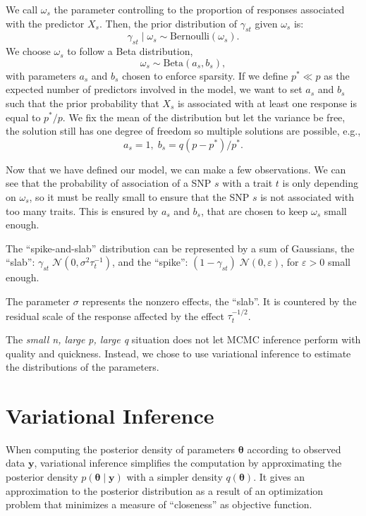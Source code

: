 \documentclass[a4paper, 11pt]{report}
\numberwithin{equation}{chapter}
\begin{document}
We call $\omega_s$ the parameter controlling to the proportion of responses associated with the predictor $X_s$. Then, the prior distribution of $\gamma_{st}$ given $\omega_s$ is:
\begin{equation*}
\gamma_{st} \mid \omega_s \sim  \text{Bernoulli}(\omega_s).
\end{equation*}
We choose $\omega_s$ to follow a Beta distribution,
\begin{equation*}
\omega_s \sim \text{Beta}(a_s, b_s),
\end{equation*}
with parameters $a_s$ and $b_s$ chosen to enforce sparsity. If we define $p^* \ll p$ as the expected number of predictors involved in the model, we want to set $a_s$ and $b_s$ such that the prior probability that $X_s$ is associated with at least one response is equal to $p^*/p$. We fix the mean of the distribution but let the variance be free, the solution still has one degree of freedom so multiple solutions are possible, e.g.,
\begin{equation*}
a_s = 1,\;b_s = q(p-p^*)/p^*.
\end{equation*}

Now that we have defined our model, we can make a few observations. We can see that the probability of association of a SNP $s$ with a trait $t$ is only depending on $\omega_s$, so it must be really small to ensure that the SNP $s$ is not associated with too many traits. This is ensured by $a_s$ and $b_s$, that are chosen to keep $\omega_s$ small enough.

The ``spike-and-slab'' distribution can be represented by a sum of Gaussians, the ``slab'': $\gamma_{st}\;\mathcal{N}\left(0,\sigma^2\tau_t^{-1}\right)$, and the ``spike'': $(1-\gamma_{st})\;\mathcal{N}\left(0, \varepsilon\right)$, for $\varepsilon > 0$ small enough.

The parameter $\sigma$ represents the nonzero effects, the ``slab''. It is countered by the residual scale of the response affected by the effect $\tau_t^{-1/2}$.

The \textit{small n, large p, large q} situation does not let MCMC inference perform with quality and quickness. Instead, we chose to use variational inference to estimate the distributions of the parameters.
\newpage
\chapter{Variational Inference}
When computing the posterior density of parameters $\boldsymbol{\theta}$ according to observed data $\boldsymbol{y}$, variational inference simplifies the computation by approximating the posterior density $p(\boldsymbol{\theta}\mid \boldsymbol{y})$ with a simpler density $q(\boldsymbol{\theta})$. It gives an approximation to the posterior distribution as a result of an optimization problem that minimizes a measure of ``closeness'' as objective function.
\end{document}
